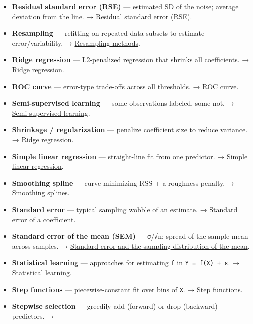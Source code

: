 \documentclass[
  10pt,
  letterpaper,
  onecolumn]{article}
\begin{document}
\begin{itemize}
{  splines}.
\item
  \textbf{Residual standard error (RSE)} --- estimated SD of the noise;
  average deviation from the line. →
  \protect\hyperlink{residual-standard-error-rse}{Residual standard
  error (RSE)}.
\item
  \textbf{Resampling} --- refitting on repeated data subsets to estimate
  error/variability. → \protect\hyperlink{resampling-methods}{Resampling
  methods}.
\item
  \textbf{Ridge regression} --- L2-penalized regression that shrinks all
  coefficients. → \protect\hyperlink{ridge-regression}{Ridge
  regression}.
\item
  \textbf{ROC curve} --- error-type trade-offs across all thresholds. →
  \protect\hyperlink{roc-curve}{ROC curve}.
\item
  \textbf{Semi-supervised learning} --- some observations labeled, some
  not. → \protect\hyperlink{semi-supervised-learning}{Semi-supervised
  learning}.
\item
  \textbf{Shrinkage / regularization} --- penalize coefficient size to
  reduce variance. → \protect\hyperlink{ridge-regression}{Ridge
  regression}.
\item
  \textbf{Simple linear regression} --- straight-line fit from one
  predictor. → \protect\hyperlink{simple-linear-regression}{Simple
  linear regression}.
\item
  \textbf{Smoothing spline} --- curve minimizing RSS + a roughness
  penalty. → \protect\hyperlink{smoothing-splines}{Smoothing splines}.
\item
  \textbf{Standard error} --- typical sampling wobble of an estimate. →
  \protect\hyperlink{standard-error-of-a-coefficient}{Standard error of
  a coefficient}.
\item
  \textbf{Standard error of the mean (SEM)} --- σ/√n; spread of the
  sample mean across samples. →
  \protect\hyperlink{standard-error-and-the-sampling-distribution-of-the-mean}{Standard
  error and the sampling distribution of the mean}.
\item
  \textbf{Statistical learning} --- approaches for estimating \texttt{f}
  in \texttt{Y\ =\ f(X)\ +\ ε}. →
  \protect\hyperlink{statistical-learning}{Statistical learning}.
\item
  \textbf{Step functions} --- piecewise-constant fit over bins of
  \texttt{X}. → \protect\hyperlink{step-functions}{Step functions}.
\item
  \textbf{Stepwise selection} --- greedily add (forward) or drop
  (backward) predictors. →

\end{itemize}
\end{document}
